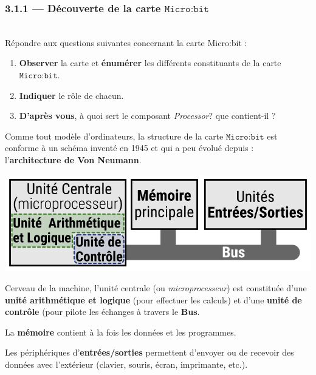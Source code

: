 \documentclass[a4paper,17pt]{extarticle}
\newenvironment{eleve}%
{\begin{activite}\color{noiramu}\\[-0.5cm]}
{\end{activite}}
\providecommand{\tightlist}{%
      \setlength{\itemsep}{0pt}\setlength{\parskip}{0pt}}
\begin{document}
    \hypertarget{duxe9couverte-de-la-carte-textttmicrobit}{%
\subsubsection{\texorpdfstring{3.1.1 --- Découverte de la carte
\(\texttt{Micro:bit}\)}{3.1.1 --- Découverte de la carte \textbackslash texttt\{Micro:bit\}}}\label{duxe9couverte-de-la-carte-textttmicrobit}}
\begin{eleve}
    Répondre aux questions suivantes concernant la carte Micro:bit :

\begin{enumerate}
\def\labelenumi{\arabic{enumi}.}
\tightlist
\item
  \textbf{Observer} la carte et \textbf{énumérer} les différents
  constituants de la carte \(\texttt{Micro:bit}\).
\item
  \textbf{Indiquer} le rôle de chacun.
\item
  \textbf{D'après vous}, à quoi sert le composant \emph{Processor}? que
  contient-il ?
\end{enumerate}
        
        \end{eleve}\begin{retenir}
    Comme tout modèle d'ordinateurs, la structure de la carte
\(\texttt{Micro:bit}\) est conforme à un schéma inventé en 1945 et qui a
peu évolué depuis : l'\textbf{architecture de Von Neumann}.

\includegraphics{./res/archi.png}

Cerveau de la machine, l'unité centrale (ou \emph{microprocesseur}) est
constituée d'une \textbf{unité arithmétique et logique} (pour effectuer
les calculs) et d'une \textbf{unité de contrôle} (pour pilote les
échanges à travers le \textbf{Bus}.

La \textbf{mémoire} contient à la fois les données et les programmes.

Les périphériques d'\textbf{entrées/sorties} permettent d'envoyer ou de
recevoir des données avec l'extérieur (clavier, souris, écran,
imprimante, etc.).

        \end{retenir}
\end{document}
